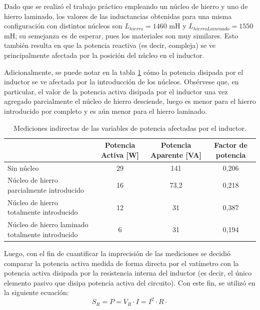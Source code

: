 \documentclass{article}
\begin{document}
            Dado que se realizó el trabajo práctico empleando un núcleo de hierro y uno de hierro laminado, los valores
            de las inductancias obtenidas para una misma configuración con distintos núcleos son $L_{hierro} = 1460$ mH
            y $L_{hierroLaminado} = 1550$ mH; su semejanza es de esperar, pues los materiales son muy similares. Esto
            también resulta en que la potencia reactiva (es decir, compleja) se ve principalmente afectada por la 
            posición del núcleo en el inductor.
            \par Adicionalmente, se puede notar en la tabla \ref{tab:MedicionesIndirectas} cómo la potencia
            disipada por el inductor se ve afectada por la introducción de los núcleos. Obsérvese que, en particular, el
            valor de la potencia activa disipada por el inductor una vez agregado parcialmente el núcleo de hierro
            desciende, luego es menor para el hierro introducido por completo y es aún menor para el hierro laminado.

            \begin{table}[h]
                \begin{tabular}{|p{5cm}|c|c|c|}
                \hline
                                                    &Potencia Activa [W]   & Potencia Aparente [VA] & Factor de potencia \\ \hline
                Sin núcleo                                &  29                      & 141 & 0,206    \\ \hline
                Núcleo de hierro parcialmente introducido     &      16                  & 73,2        & 0,218  \\ \hline           
                Núcleo de hierro totalmente introducido       &     12               & 31          & 0,387    \\ \hline           
                Núcleo de hierro laminado totalmente introducido & 6               & 31 & 0,194  \\ \hline
                \end{tabular}
                \caption{Mediciones indirectas de las variables de potencia afectadas por el inductor.}
                \label{tab:MedicionesIndirectas}
            \end{table}


            Luego, con el fin de cuantificar la imprecisión de las mediciones se decidió comparar la potencia activa
            medida de forma directa por el vatímetro con la potencia activa disipada por la resistencia interna del inductor
            (es decir, el único elemento pasivo que disipa potencia activa del circuito). Con este fin, se utilizó en la siguiente
             ecuación:
            \begin{equation}
               S_R = P = V_R \cdot I = I^2 \cdot R \cdot
             \end{equation}
\end{document}

